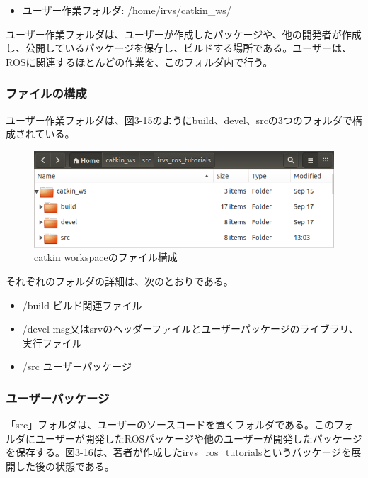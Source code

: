 \begin{itemize}
\item ユーザー作業フォルダ: /home/irvs/catkin\_ws/
\end{itemize}

ユーザー作業フォルダは、ユーザーが作成したパッケージや、他の開発者が作成し、公開しているパッケージを保存し、ビルドする場所である。ユーザーは、ROSに関連するほとんどの作業を、このフォルダ内で行う。

\subsubsection{ファイルの構成}
ユーザー作業フォルダは、図3-15のようにbuild、devel、srcの3つのフォルダで構成されている。

\begin{figure}[h]
  \centering
  \includegraphics[width=\columnwidth]{pictures/chapter3/pic_03_15.png}
  \caption{catkin workspaceのファイル構成}
\end{figure}

それぞれのフォルダの詳細は、次のとおりである。

\begin{itemize}
\item /build  ビルド関連ファイル
\item /devel  msg又はsrvのヘッダーファイルとユーザーパッケージのライブラリ、実行ファイル
\item /src    ユーザーパッケージ
\end{itemize}

\subsubsection{ユーザーパッケージ}
「src」フォルダは、ユーザーのソースコードを置くフォルダである。このフォルダにユーザーが開発したROSパッケージや他のユーザーが開発したパッケージを保存する。図3-16は、著者が作成したirvs\_ros\_tutorialsというパッケージを展開した後の状態である。

